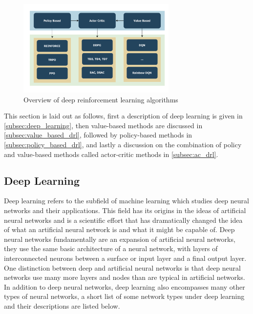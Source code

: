 \documentclass[../report.tex]{subfiles}
\begin{document}
\begin{figure}[H]
    \centering
    \includegraphics[width=0.7\textwidth]{figures/01/drl.pdf}
    \caption{Overview of deep reinforcement learning algorithms}
    \label{fig:drl}
\end{figure}

This section is laid out as follows, first a description of deep learning is given in \autoref{subsec:deep_learning}, then value-based methods are discussed in \autoref{subsec:value_based_drl}, followed by policy-based methods in \autoref{subsec:policy_based_drl}, and lastly a discussion on the combination of policy and value-based methods called actor-critic methods in \autoref{subsec:ac_drl}.

\subsection{Deep Learning}\label{subsec:deep_learning}

Deep learning refers to the subfield of machine learning which studies deep neural networks and their applications. This field has its origins in the ideas of artificial neural networks and is a scientific effort that has dramatically changed the idea of what an artificial neural network is and what it might be capable of. Deep neural networks fundamentally are an expansion of artificial neural networks, they use the same basic architecture of a neural network, with layers of interconnected neurons between a surface or input layer and a final output layer. One distinction between deep and artificial neural networks is that deep neural networks use many more layers and nodes than are typical in artificial networks. In addition to deep neural networks, deep learning also encompasses many other types of neural networks, a short list of some network types under deep learning and their descriptions are listed below.
\end{document}
